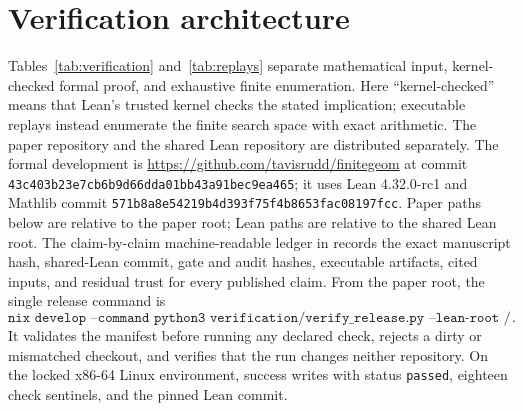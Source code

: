\documentclass[11pt]{article}
\theoremstyle{definition}
\theoremstyle{remark}
\begin{document}
\section{Verification architecture}
\label{sec:verification}

Tables~\ref{tab:verification} and~\ref{tab:replays} separate mathematical
input, kernel-checked formal proof, and exhaustive finite enumeration. Here
``kernel-checked'' means that Lean's trusted kernel checks the stated
implication; executable replays instead enumerate the finite search space
with exact arithmetic.  The paper repository and the shared Lean repository
are distributed separately.  The formal development is
\url{https://github.com/tavisrudd/finitegeom} at commit
\texttt{43c403b23e7cb6b9d66dda01bb43a91bec9ea465}; it uses Lean
4.32.0-rc1 and Mathlib commit
\texttt{571b8a8e54219b4d393f75f4b8653fac08197fcc}.  Paper paths below are
relative to the paper root; Lean paths are relative to the shared Lean
root.  The
claim-by-claim machine-readable ledger in
 records the exact manuscript hash,
shared-Lean commit, gate and audit hashes, executable artifacts, cited
inputs, and residual trust for every published claim.  From the paper root,
the single release command is
\[
 \texttt{nix develop --command python3 verification/verify\_release.py
 --lean-root /path/to/finitegeom}.
\]
It validates the manifest before running any declared check, rejects a
dirty or mismatched checkout, and verifies that the run changes neither
repository.  On the locked x86-64 Linux environment, success writes
 with status
\texttt{passed}, eighteen check sentinels, and the pinned Lean commit.
\end{document}
